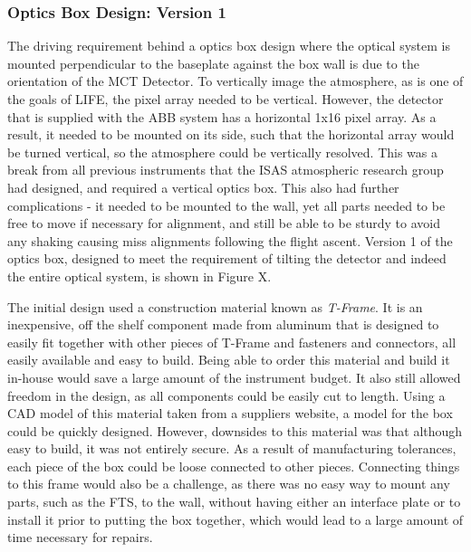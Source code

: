 \subsubsection{Optics Box Design: Version 1}
The driving requirement behind a optics box design where the optical system is mounted perpendicular to the baseplate against the box wall is due to the orientation of the MCT Detector. To vertically image the atmosphere, as is one of the goals of LIFE, the pixel array needed to be vertical. However, the detector that is supplied with the ABB system has a horizontal 1x16 pixel array. As a result, it needed to be mounted on its side, such that the horizontal array would be turned vertical, so the atmosphere could be vertically resolved. This was a break from all previous instruments that the ISAS atmospheric research group had designed, and required a vertical optics box. This also had further complications - it needed to be mounted to the wall, yet all parts needed to be free to move if necessary for alignment, and still be able to be sturdy to avoid any shaking causing miss alignments following the flight ascent. Version 1 of the optics box, designed to meet the requirement of tilting the detector and indeed the entire optical system, is shown in Figure X.


The initial design used a construction material known as \textit{T-Frame}. It is an inexpensive, off the shelf component made from aluminum that is designed to easily fit together with other pieces of T-Frame and fasteners and connectors, all easily available and easy to build. Being able to order this material and build it in-house would save a large amount of the instrument budget. It also still allowed freedom in the design, as all components could be easily cut to length. Using a CAD model of this material taken from a suppliers website, a model for the box could be quickly designed. However, downsides to this material was that although easy to build, it was not entirely secure. As a result of manufacturing tolerances, each piece of the box could be loose connected to other pieces. Connecting things to this frame would also be a challenge, as there was no easy way to mount any parts, such as the FTS, to the wall, without having either an interface plate or to install it prior to putting the box together, which would lead to a large amount of time necessary for repairs.

